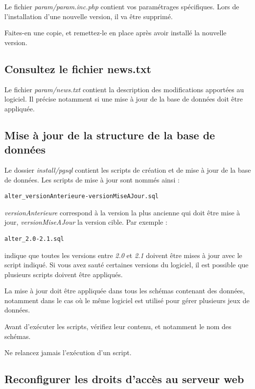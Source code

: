 Le fichier \textit{param/param.inc.php} contient vos paramétrages spécifiques. Lors de l'installation d'une nouvelle version, il va être supprimé.

Faites-en une copie, et remettez-le en place après avoir installé la nouvelle version.

\subsection{Consultez le fichier news.txt}

Le fichier \textit{param/news.txt} contient la description des modifications apportées au logiciel. Il précise notamment si une mise à jour de la base de données doit être appliquée.

\subsection{Mise à jour de la structure de la base de données}

Le dossier \textit{install/pgsql} contient les scripts de création et de mise à jour de la base de données. Les scripts de mise à jour sont nommés ainsi :
\begin{lstlisting}
alter_versionAnterieure-versionMiseAJour.sql
\end{lstlisting}

\textit{versionAnterieure} correspond à la version la plus ancienne qui doit être mise à jour, \textit{versionMiseAJour} la version cible. Par exemple :
\begin{lstlisting}
alter_2.0-2.1.sql
\end{lstlisting}
indique que toutes les versions entre \textit{2.0} et \textit{2.1} doivent être mises à jour avec le script indiqué. Si vous avez \og sauté \fg{} certaines versions du logiciel, il est possible que plusieurs scripts doivent être appliqués.

La mise à jour doit être appliquée dans tous les schémas contenant des données, notamment dans le cas où le même logiciel est utilisé pour gérer plusieurs jeux de données.

Avant d'exécuter les scripts, vérifiez leur contenu, et notamment le nom des schémas.

Ne relancez jamais l'exécution d'un script.

\subsection{Reconfigurer les droits d'accès au serveur web}

